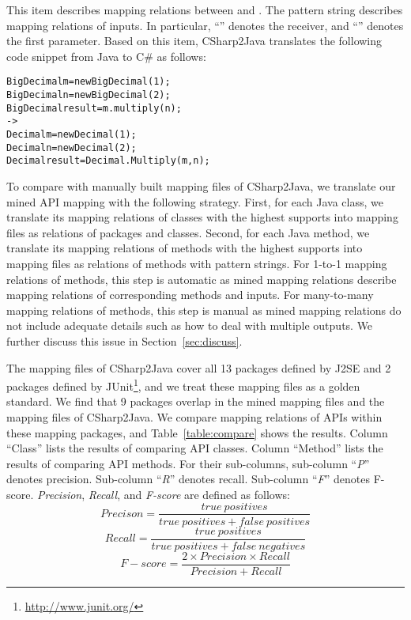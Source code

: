 This item describes mapping relations between  and . The
pattern string describes mapping relations of inputs. In particular,
``'' denotes the receiver, and ``'' denotes
the first parameter. Based on this item, CSharp2Java translates the
following code snippet from Java to C\# as follows:

\begin{CodeOut}\vspace*{-1ex}
\begin{alltt}
  BigDecimal m = new BigDecimal(1);
  BigDecimal n = new BigDecimal(2);
  BigDecimal result = m.multiply(n);
  ->
  Decimal m = new Decimal(1);
  Decimal n = new Decimal(2);
  Decimal result = Decimal.Multiply(m,n);
\end{alltt}
\end{CodeOut}\vspace*{-1ex}

To compare with manually built mapping files of CSharp2Java, we
translate our mined API mapping with the following strategy. First,
for each Java class, we translate its mapping relations of classes
with the highest supports into mapping files as relations of
packages and classes. Second, for each Java method, we translate its
mapping relations of methods with the highest supports into mapping
files as relations of methods with pattern strings. For 1-to-1
mapping relations of methods, this step is automatic as mined
mapping relations describe mapping relations of corresponding
methods and inputs. For many-to-many mapping relations of methods,
this step is manual as mined mapping relations do not include
adequate details such as how to deal with multiple outputs. We
further discuss this issue in Section~\ref{sec:discuss}.

The mapping files of CSharp2Java cover all 13 packages defined by
J2SE and 2 packages defined by
JUnit\footnote{\url{http://www.junit.org/}}, and we treat these
mapping files as a golden standard. We find that 9 packages overlap
in the mined mapping files and the mapping files of CSharp2Java. We
compare mapping relations of APIs within these mapping packages, and
Table~\ref{table:compare} shows the results. Column ``Class'' lists
the results of comparing API classes. Column ``Method'' lists the
results of comparing API methods. For their sub-columns, sub-column
``\emph{P}'' denotes precision. Sub-column ``\emph{R}'' denotes
recall. Sub-column ``\emph{F}'' denotes F-score. \emph{Precision},
\emph{Recall}, and \emph{F-score} are defined as follows:
\begin{equation}\label{eq-precison}
Precison=\frac{true\ positives}{true\ positives+false\ positives}
\end{equation}
\begin{equation}\label{eq-recall}
Recall=\frac{true\ positives}{true\ positives+false\ negatives}
\end{equation}
\begin{equation}\label{eq-fscore}
F\!-\!score=\frac{2\times Precision \times Recall}{Precision+Recall}
\end{equation}


